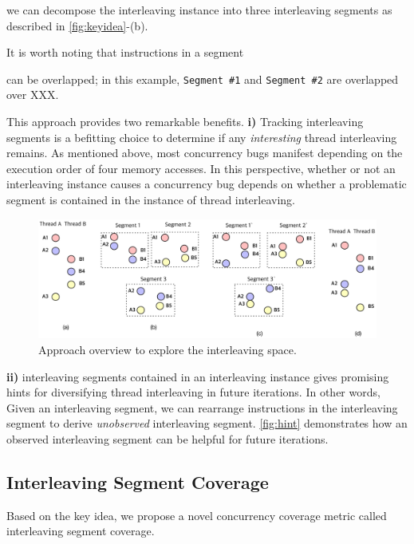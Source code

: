 we can decompose the interleaving instance into three interleaving
segments as described in \autoref{fig:keyidea}-(b).


It is worth noting that instructions in a segment \dr{}

can be overlapped; in this example,
\texttt{Segment \#1} and \texttt{Segment \#2} are overlapped over XXX.





%
This approach provides two remarkable benefits.
%
\textbf{i)} Tracking interleaving segments is a befitting choice to
determine if any \textit{interesting} thread interleaving remains.
%
As mentioned above, most concurrency bugs manifest depending on the
execution order of four memory accesses.
%
In this perspective, whether or not an interleaving instance causes a
concurrency bug depends on whether a problematic segment is contained
in the instance of thread interleaving.
%
\dr{}



\begin{figure}[t]
  \includegraphics[width=0.9\linewidth]{fig/intuition.pdf}
  \caption{Approach overview to explore the interleaving
    space.}
  \label{fig:hint}
\end{figure}
%
\textbf{ii)} interleaving segments contained in an interleaving
instance gives promising hints for diversifying thread interleaving in
future iterations.
%
In other words, Given an interleaving segment, we can rearrange
instructions in the interleaving segment to derive \textit{unobserved}
interleaving segment.
%
\autoref{fig:hint} demonstrates how an observed interleaving segment
can be helpful for future iterations.
%
\dr{}



\subsection{Interleaving Segment Coverage}
\label{ss:coverage}

Based on the key idea, we propose a novel concurrency coverage metric
called interleaving segment coverage.
%



